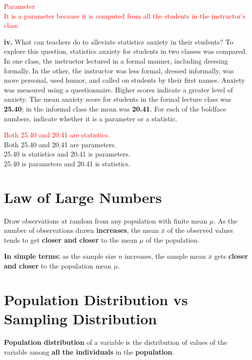 \noindent \textcolor{red}{Parameter} \\
\textcolor{red}{It is a parameter because it is computed from all the students in the instructor's class.}

\vspace{0.2cm}

\textbf{iv.} What can teachers do to alleviate statistics anxiety in their students? To explore this question, statistics anxiety for students in two classes was compared. In one class, the instructor lectured in a formal manner, including dressing formally. In the other, the instructor was less formal, dressed informally, was more personal, used humor, and called on students by their first names. Anxiety was measured using a questionnaire. Higher scores indicate a greater level of anxiety. The mean anxiety score for students in the formal lecture class was \textbf{25.40}; in the informal class the mean was \textbf{20.41}. For each of the boldface numbers, indicate whether it is a parameter or a statistic.

\noindent \textcolor{red}{Both 25.40 and 20.41 are statistics.} \\
Both 25.40 and 20.41 are parameters. \\
25.40 is statistics and 20.41 is parameters. \\
25.40 is parameters and 20.41 is statistics.


\section{Law of Large Numbers}
Draw observations at random from any population with finite mean $\mu$. As the number of observations drawn \textbf{increases}, the mean $\bar{x}$ of the observed values tends to get \textbf{closer and closer} to the mean $\mu$ of the population.

\vspace{0.2cm}

\textbf{In simple terms:} as the sample size $n$ increases, the sample mean $\bar{x}$ gets \textbf{closer and closer} to the population mean $\mu$.

\section*{Population Distribution vs Sampling Distribution}

\textbf{Population distribution} of a variable is the distribution of values of the variable among \textbf{all the individuals} in the \textbf{population}. 

